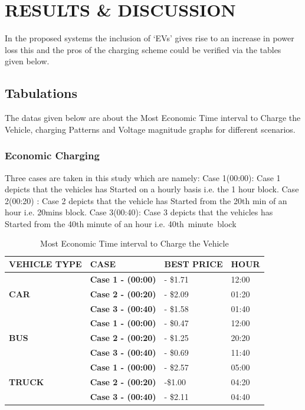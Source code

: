 
	\chapter{RESULTS \& DISCUSSION}
	\label{chap:results}
		In the proposed systems the inclusion of `EVs' gives rise to an increase in power loss this and the pros of the charging scheme could be verified via the tables given below.
	\section{Tabulations}
	The datas given below are about the Most Economic Time interval to Charge the Vehicle, charging Patterns and Voltage magnitude graphs for different scenarios.
		\subsection{Economic Charging}
		
			Three cases are taken in this study which are namely:
				Case 1(00:00): Case 1 depicts that the vehicles has Started on a hourly basis i.e. the 1 hour block.
				Case 2(00:20) : Case 2 depicts that the vehicle has Started from the 20th min of an hour i.e. 20mins block.
				Case 3(00:40): Case 3 depicts that the vehicles has Started from the 40th minute of an hour i.e. 40th minute block
			
			\begin{table}[!h]
				\caption{Most Economic Time interval to Charge the Vehicle}
				\centering
			\begin{tabular}{|l|l|l|l|}
				\hline
				\textbf{VEHICLE TYPE}           & \textbf{CASE}         & \textbf{BEST PRICE} & \textbf{HOUR} \\ \hline
				\multirow{3}{*}{\textbf{CAR}}   & \textbf{Case 1 - (00:00)} & - \$1.71            & 12:00         \\ \cline{2-4} 
				& \textbf{Case 2 - (00:20)} & - \$2.09            & 01:20         \\ \cline{2-4} 
				& \textbf{Case 3 - (00:40)} & - \$1.58            & 01:40         \\ \hline
				\multirow{3}{*}{\textbf{BUS}}   & \textbf{Case 1 - (00:00)} & - \$0.47            & 12:00         \\ \cline{2-4} 
				& \textbf{Case 2 - (00:20)} & - \$1.25            & 20:20         \\ \cline{2-4} 
				& \textbf{Case 3 - (00:40)} & - \$0.69            & 11:40         \\ \hline
				\multirow{3}{*}{\textbf{TRUCK}} & \textbf{Case 1 - (00:00)} & - \$2.57            & 05:00         \\ \cline{2-4} 
				& \textbf{Case 2 - (00:20)} & -\$1.00             & 04:20         \\ \cline{2-4} 
				& \textbf{Case 3 - (00:40)} & - \$2.11            & 04:40         \\ \hline
			\end{tabular}
		\end{table}
		
